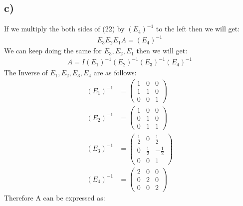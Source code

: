 \documentclass[11pt]{article}
\begin{document}
\newpage

\subsection{c)}
If we multiply the both sides of (22) by $(E_4)^{-1}$ to the left then we will get:
\begin{align}
E_3E_2E_1A=(E_4)^{-1}
\end{align}
We can keep doing the same for $E_3,E_2,E_1$ then we will get:
\begin{align}
A=I(E_1)^{-1}(E_2)^{-1}(E_3)^{-1}(E_4)^{-1}
\end{align}
The Inverse of $E_1,E_2,E_3,E_4$ are as follows:
\begin{align*}
(E_1)^{-1}&=
\left(\begin{array}{ccc}
1 & 0 & 0 \\
1 & 1 & 0 \\
0 & 0 & 1
\end{array}\right)
\\
(E_2)^{-1}&=
\left(\begin{array}{ccc}
1 & 0 & 0 \\
0 & 1 & 0 \\
0 & 1 & 1
\end{array}\right)
\\
(E_3)^{-1}&=
\left(\begin{array}{ccc}
\frac{1}{2} & 0 & \frac{1}{2} \\
0 & \frac{1}{2} & -\frac{1}{2} \\
0 & 0 & 1
\end{array}\right)
\\
(E_4)^{-1}&=
\left(\begin{array}{ccc}
2 & 0 & 0 \\
0 & 2 & 0 \\
0 & 0 & 2
\end{array}\right)
\end{align*}
Therefore A can be expressed as:
\end{document}
